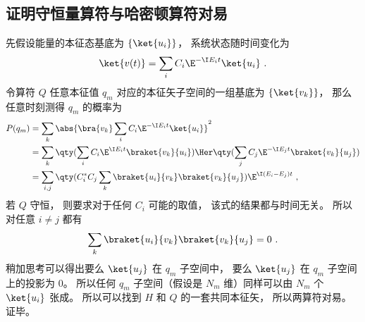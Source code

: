 \subsection{证明守恒量算符与哈密顿算符对易}
先假设能量的本征态基底为 $\{\ket{u_i}\}$， 系统状态随时间变化为
\begin{equation}
\ket{v(t)} = \sum_i C_i \E^{-\I E_i t} \ket{u_i}~.
\end{equation}
令算符 $Q$ 任意本征值 $q_m$ 对应的本征矢子空间的一组基底为 $\{\ket{v_k}\}$， 那么任意时刻测得 $q_m$ 的概率为
\begin{equation}
\begin{aligned}
P(q_m) &= \sum_k \abs{\bra{v_k} \sum_i C_i \E^{-\I E_i t} \ket{u_i}}^2\\
&= \sum_k \qty(\sum_i C_i \E^{\I E_i t} \braket{v_k}{u_i})\Her \qty(\sum_j C_j \E^{-\I E_j t} \braket{v_k}{u_j})\\
&= \sum_{i,j} \qty( C_i^* C_j \sum_k \braket{u_i}{v_k} \braket{v_k}{u_j}) \E^{\I (E_i - E_j) t}~,
\end{aligned}
\end{equation}
若 $Q$ 守恒， 则要求对于任何 $C_i$ 可能的取值， 该式的结果都与时间无关。 所以对任意 $i \ne j$ 都有
\begin{equation}
\sum_k \braket{u_i}{v_k} \braket{v_k}{u_j} = 0~.
\end{equation}
稍加思考可以得出要么 $\ket{u_j}$ 在 $q_m$ 子空间中， 要么 $\ket{u_j}$ 在 $q_m$ 子空间上的投影为 0。 所以任何 $q_m$ 子空间（假设是 $N_m$ 维）同样可以由 $N_m$ 个 $\ket{u_i}$ 张成。 所以可以找到 $H$ 和 $Q$ 的一套共同本征矢， 所以两算符对易。 证毕。
